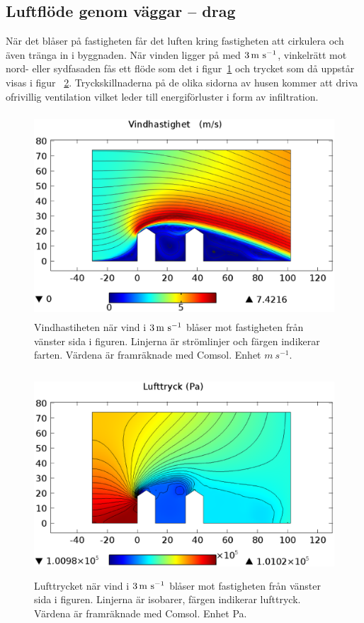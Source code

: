 \subsection{Luftflöde genom väggar – drag}
\label{sec:leakagewall}

När det blåser på fastigheten får det luften kring fastigheten att cirkulera och även tränga in i 
byggnaden. När vinden ligger på med $\unit[3]{m~s^{-1}}$, vinkelrätt mot nord- eller sydfasaden fås 
ett flöde som det i figur~\ref{fig:windspeed} och trycket som då uppstår visas i figur~
\ref{fig:windpressure}. Tryckskillnaderna på de olika sidorna av husen kommer att driva 
ofrivillig ventilation vilket leder till energiförluster i form av infiltration.

\begin{figure}[hpbt]
\centering
\includegraphics[width=127mm,height=76mm]{images/wind3mshdpi.eps}
\caption{\label{fig:windspeed}Vindhastiheten när vind i $\unit[3]{m~s^{-1}}$ blåser mot fastigheten 
från vänster sida i figuren. Linjerna är strömlinjer och färgen indikerar farten. Värdena är 
framräknade med Comsol. Enhet $\unit{m~s^{-1}}$.}
\end{figure}


\begin{figure}[hpbt]
\centering
\includegraphics[width=127mm,height=76mm]{images/pressure3mshdpi.eps}

\caption{\label{fig:windpressure}Lufttrycket när vind i $\unit[3]{m~s^{-1}}$ blåser mot fastigheten från vänster sida i figuren. Linjerna är isobarer, färgen indikerar lufttryck. Värdena är framräknade med Comsol. Enhet Pa.}
\end{figure}

